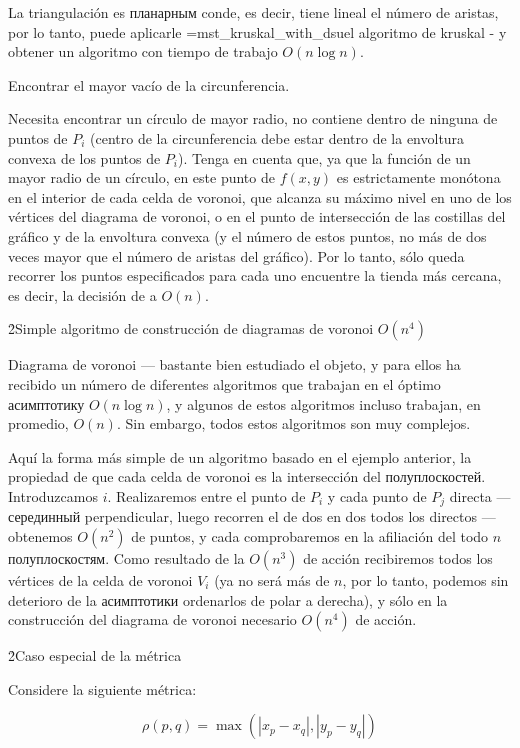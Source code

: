{La triangulación es планарным conde, es decir, tiene lineal el número de aristas, por lo tanto, puede aplicarle \algohref=mst_kruskal_with_dsu{el algoritmo de kruskal -} y obtener un algoritmo con tiempo de trabajo $O(n \log n)$.

\li Encontrar el mayor vacío de la circunferencia.

Necesita encontrar un círculo de mayor radio, no contiene dentro de ninguna de puntos de $P_i$ (centro de la circunferencia debe estar dentro de la envoltura convexa de los puntos de $P_i$). Tenga en cuenta que, ya que la función de un mayor radio de un círculo, en este punto de $f(x,y)$ es estrictamente monótona en el interior de cada celda de voronoi, que alcanza su máximo nivel en uno de los vértices del diagrama de voronoi, o en el punto de intersección de las costillas del gráfico y de la envoltura convexa (y el número de estos puntos, no más de dos veces mayor que el número de aristas del gráfico). Por lo tanto, sólo queda recorrer los puntos especificados para cada uno encuentre la tienda más cercana, es decir, la decisión de a $O(n)$.

}

\h2{Simple algoritmo de construcción de diagramas de voronoi $O(n^4)$}

Diagrama de voronoi --- bastante bien estudiado el objeto, y para ellos ha recibido un número de diferentes algoritmos que trabajan en el óptimo асимптотику $O (n \log n)$, y algunos de estos algoritmos incluso trabajan, en promedio, $O (n)$. Sin embargo, todos estos algoritmos son muy complejos.

Aquí la forma más simple de un algoritmo basado en el ejemplo anterior, la propiedad de que cada celda de voronoi es la intersección del полуплоскостей. Introduzcamos $i$. Realizaremos entre el punto de $P_i$ y cada punto de $P_j$ directa --- серединный perpendicular, luego recorren el de dos en dos todos los directos --- obtenemos $O(n^2)$ de puntos, y cada comprobaremos en la afiliación del todo $n$ полуплоскостям. Como resultado de la $O(n^3)$ de acción recibiremos todos los vértices de la celda de voronoi $V_i$ (ya no será más de $n$, por lo tanto, podemos sin deterioro de la асимптотики ordenarlos de polar a derecha), y sólo en la construcción del diagrama de voronoi necesario $O(n^4)$ de acción.

\h2{Caso especial de la métrica}

Considere la siguiente métrica:

$$ \rho(p,q) = \max (|x_p-x_q|, |y_p-y_q|) $$

